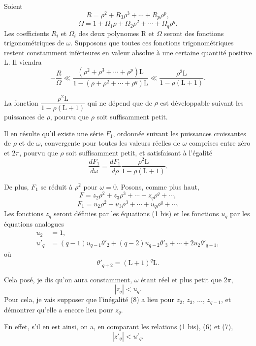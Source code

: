 \documentclass[11pt]{article}
\begin{document}
Soient
\[
R=\rho^2+R_3\rho^3+\cdots+R_p\rho^p,
\]
\[
\Omega=1+\Omega_1\rho+\Omega_2\rho^2+\cdots+\Omega_q\rho^q.
\]
Les coefficients $R_i$ et $\Omega_i$ des deux polynomes R et $\Omega$ seront des fonctions trigonométriques de $\omega$. Supposons que toutes ces fonctions trigonométriques restent constamment inférieures en valeur absolue à une certaine quantité positive L. Il viendra
\begin{equation}\tag{6}
-\frac{R}{\Omega}
\ll
\frac{(\rho^2+\rho^3+\cdots+\rho^p)\mathrm L}{1-(\rho+\rho^2+\cdots+\rho^q)\mathrm L}
\ll
\frac{\rho^2\mathrm L}{1-\rho(\mathrm L+1)}.
\end{equation}

La fonction $\dfrac{\rho^2\mathrm L}{1-\rho(\mathrm L+1)}$ qui ne dépend que de $\rho$ est développable suivant les puissances de $\rho$, pourvu que $\rho$ soit suffisamment petit.

Il en résulte qu’il existe une série $F_1$, ordonnée suivant les puissances croissantes de $\rho$ et de $\omega$, convergente pour toutes les valeurs réelles de $\omega$ comprises entre zéro et $2\pi$, pourvu que $\rho$ soit suffisamment petit, et satisfaisant à l’égalité
\[
\frac{dF_1}{d\omega}=\frac{dF_1}{d\rho}\frac{\rho^2\mathrm L}{1-\rho(\mathrm L+1)}.
\]

De plus, $F_1$ se réduit à $\rho^2$ pour $\omega=0$. Posons, comme plus haut,
\[
F=z_2\rho^2+z_3\rho^3+\cdots+z_q\rho^q+\cdots,
\]
\[
F_1=u_2\rho^2+u_3\rho^3+\cdots+u_q\rho^q+\cdots.
\]
Les fonctions $z_q$ seront définies par les équations (1 bis) et les fonctions $u_q$ par les équations analogues
\begin{equation}\tag{7}
\begin{aligned}
u_2&=1,\\
u'_q&=(q-1)u_{q-1}\theta'_2+(q-2)u_{q-2}\theta'_3+\cdots+2u_2\theta'_{q-1},
\end{aligned}
\end{equation}
où
\[
\theta'_{q+2}=(\mathrm L+1)^q\mathrm L.
\]

Cela posé, je dis qu’on aura constamment, $\omega$ étant réel et plus petit que $2\pi$,
\begin{equation}\tag{8}
|z_q|<u_q.
\end{equation}
Pour cela, je vais supposer que l’inégalité (8) a lieu pour $z_2$, $z_3$, $\ldots$, $z_{q-1}$, et démontrer qu’elle a encore lieu pour $z_q$.

En effet, s’il en est ainsi, on a, en comparant les relations (1 bis), (6) et (7),
\begin{equation}\tag{9}
|z'_q|<u'_q.
\end{equation}
\end{document}
